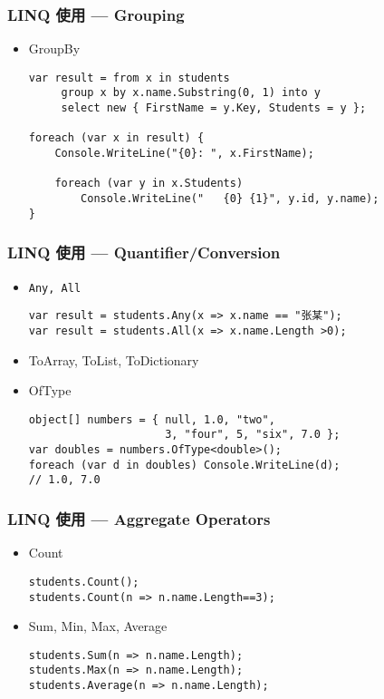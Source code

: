 \begin{frame}[fragile]
\frametitle{LINQ 使用 --- Grouping}
\begin{itemize}
\item GroupBy
\begin{lstlisting}
var result = from x in students
     group x by x.name.Substring(0, 1) into y
     select new { FirstName = y.Key, Students = y };

foreach (var x in result) {
    Console.WriteLine("{0}: ", x.FirstName);

    foreach (var y in x.Students)
        Console.WriteLine("   {0} {1}", y.id, y.name);
}
\end{lstlisting}
\end{itemize}
\end{frame}


\begin{frame}[fragile]
\frametitle{LINQ 使用 --- Quantifier/Conversion}
\begin{itemize}
\item \texttt{Any, All}
\begin{lstlisting}
var result = students.Any(x => x.name == "张某");
var result = students.All(x => x.name.Length >0);
\end{lstlisting}
\item ToArray, ToList, ToDictionary
\item OfType
\begin{lstlisting}
object[] numbers = { null, 1.0, "two", 
                     3, "four", 5, "six", 7.0 }; 
var doubles = numbers.OfType<double>(); 
foreach (var d in doubles) Console.WriteLine(d); 
// 1.0, 7.0
\end{lstlisting}
\end{itemize}
\end{frame}



\begin{frame}[fragile]
\frametitle{LINQ 使用 --- Aggregate Operators}
\begin{itemize}
\item Count
\begin{lstlisting}
students.Count();
students.Count(n => n.name.Length==3);
\end{lstlisting}
\item Sum, Min, Max, Average
\begin{lstlisting}
students.Sum(n => n.name.Length);
students.Max(n => n.name.Length);
students.Average(n => n.name.Length);
\end{lstlisting}
\end{itemize}
\end{frame}



